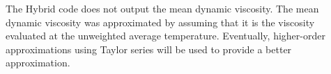 The Hybrid code does not output the mean dynamic viscosity.  The mean dynamic
viscosity was approximated by assuming that it is the viscosity evaluated at
the unweighted average temperature.  Eventually, higher-order approximations
using Taylor series will be used to provide a better approximation.
